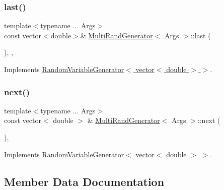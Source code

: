 \hypertarget{class_multi_rand_generator_abb83dee0545ca24fab2999144de6f0e3}{}\label{class_multi_rand_generator_abb83dee0545ca24fab2999144de6f0e3} 
\subsubsection{\texorpdfstring{last()}{last()}}
{\footnotesize\ttfamily template$<$typename ... Args$>$ \\
const vector$<$double$>$\& \hyperlink{class_multi_rand_generator}{Multi\+Rand\+Generator}$<$ Args $>$\+::last (\begin{DoxyParamCaption}{ }\end{DoxyParamCaption})\hspace{0.3cm}{\ttfamily [inline]}, {\ttfamily [override]}, {\ttfamily [virtual]}}



Implements \hyperlink{class_random_variable_generator_aa84922aa58871845bc12116e05e6b5d4}{Random\+Variable\+Generator$<$ vector$<$ double $>$ $>$}.

\hypertarget{class_multi_rand_generator_a39838e440c70bb6de68052a2ea25e258}{}\label{class_multi_rand_generator_a39838e440c70bb6de68052a2ea25e258} 
\subsubsection{\texorpdfstring{next()}{next()}}
{\footnotesize\ttfamily template$<$typename ... Args$>$ \\
const vector$<$ double $>$ \& \hyperlink{class_multi_rand_generator}{Multi\+Rand\+Generator}$<$ Args $>$\+::next (\begin{DoxyParamCaption}{ }\end{DoxyParamCaption})\hspace{0.3cm}{\ttfamily [override]}, {\ttfamily [virtual]}}



Implements \hyperlink{class_random_variable_generator_a5178e1f85eff432dffd6320767136836}{Random\+Variable\+Generator$<$ vector$<$ double $>$ $>$}.



\subsection{Member Data Documentation}
\hypertarget{class_multi_rand_generator_a31ad84bf3f1e2c7db54b563945801b75}{}\label{class_multi_rand_generator_a31ad84bf3f1e2c7db54b563945801b75} 
